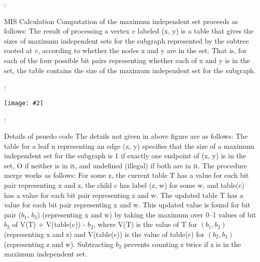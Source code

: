 \documentclass{beamer}
\newcommand{\iph}[2]{
    \texttt{[image: \#2]}
}
\begin{document}
\begin{frame}{\secname : \subsecname}
    \begin{block}{MIS Calculation}
        Computation of the maximum independent set proceeds as follows: The
        result of processing a vertex $v$ labeled (x, y) is a table that gives the sizes of
        maximum independent sets for the subgraph represented by the subtree rooted at $v$, according to whether the nodes x and y are in the set. That is, for each of
        the four possible bit pairs representing whether each of x and y is in the set,
        the table contains the size of the maximum independent set for the subgraph. 
    \end{block}
\end{frame}

\begin{frame}{\secname : \subsecname}
    \iph{0.9}{lin5}

\end{frame}



\begin{framefont}{\small}
\begin{frame}{\secname : \subsecname}
    \begin{block}{Details of psuedo code}
        The details not given in above figure are as follows: The table for a leaf u
representing an edge (x, y) specifies that the size of a maximum independent
set for the subgraph is 1 if exactly one endpoint of (x, y) is in the set, O if
neither is in it, and undefined (illegal) if both are in it. The procedure merge
works as follows: For some z, the current table T has a value for each bit pair
representing x and z, the child c has label (z, w) for some w, and table(c) has
a value for each bit pair representing z and w. The updated table T has a
value for each bit pair representing x and w. This updated value is found for
bit pair ($b_1$, $b_3$) (representing x and w) by taking the maximum over 0–1 values
of bit $b_2$ of V(T) + V(table(c)) - $b_2$, where V(T) is the value of T for $(b_1, b_2)$
(representing x and z) and V(table(c)) is the value of table(c) for $(b_2, b_3)$
(representing z and w). Subtracting $b_2$ prevents counting z twice if z is in the
maximum independent set. 
    \end{block}
\end{frame}
\end{framefont}
\end{document}
